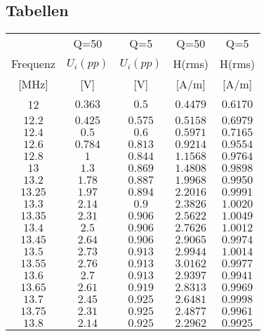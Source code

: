 \documentclass[12pt,a4paper,ngerman]{article}
\begin{document}
\subsection{Tabellen}
\begin{table}[H]
\begin{center}
\begin{tabular}{ |c|c|c|c|c| }
  \hline
     & Q=50 & Q=5 & Q=50 & Q=5\\
    Frequenz & $U_i(pp)$ & $U_i(pp)$ & H(rms) & H(rms)\\

  {[MHz]} & {[V]} & {[V]} & {[A/m]} & {[A/m]} \\
  \hline
  12 & $0.363$ & $0.5$ & $0.4479$ & $0.6170$ \\
  \hline
  $12.2$ & $0.425$ & $0.575$ & $0.5158$ & $0.6979$ \\
  \hline
  $12.4$ & $0.5$ & $0.6$ & $0.5971$ & $0.7165$ \\
  \hline
  $12.6$ & $0.784$ & $0.813$ & $0.9214$ & $0.9554$ \\
    \hline
  $12.8$ & $1$ & $0.844$ & $1.1568$ & $0.9764$ \\
    \hline
  $13$ & $1.3$ & $0.869$ & $1.4808$ & $0.9898$ \\
    \hline
  $13.2$ & $1.78$ & $0.887$ & $1.9968$ & $0.9950$ \\
     \hline
  $13.25$ & $1.97$ & $0.894$ & $2.2016$ & $0.9991$ \\ 
    \hline
  $13.3$ & $2.14$ & $0.9$ & $2.3826$ & $1.0020$ \\
    \hline
  $13.35$ & $2.31$ & $0.906$ & $2.5622$ & $1.0049$ \\
    \hline
  $13.4$ & $2.5$ & $0.906$ & $2.7626$ & $1.0012$ \\
    \hline
  $13.45$ & $2.64$ & $0.906$ & $2.9065$ & $0.9974$ \\
    \hline
  $13.5$ & $2.73$ & $0.913$ & $2.9944$ & $1.0014$ \\
     \hline
  $13.55$ & $2.76$ & $0.913$ & $3.0162$ & $0.9977$ \\
      \hline
  $13.6$ & $2.7$ & $0.913$ & $2.9397$ & $0.9941$ \\ 
      \hline
  $13.65$ & $2.61$ & $0.919$ & $2.8313$ & $0.9969$ \\
      \hline
  $13.7$ & $2.45$ & $0.925$ & $2.6481$ & $0.9998$ \\
      \hline
  $13.75$ & $2.31$ & $0.925$ & $2.4877$ & $0.9961$ \\
      \hline
  $13.8$ & $2.14$ & $0.925$ & $2.2962$ & $0.9925$ \\

\end{tabular}
\end{center}
\end{table}
\end{document}
